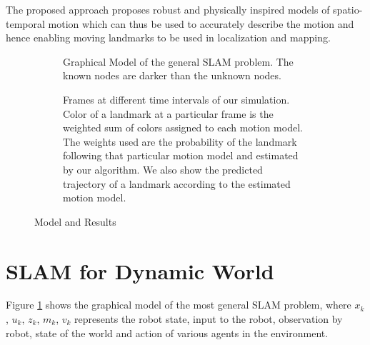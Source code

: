 \documentclass[10pt,twocolumn,letterpaper]{article}
\begin{document}
The proposed approach proposes robust and physically inspired models of spatio-temporal motion which can thus be used to accurately describe the motion and hence enabling moving landmarks to be used in localization and mapping.


\begin{figure*}[t]
  \begin{subfigure}[t]{0.33\textwidth}
    \scalebox{0.65}{  }
    \caption{Graphical Model of the general SLAM problem. The known nodes are darker than the unknown nodes.}
    \label{fig:graphical_model}
  \end{subfigure}
  \hskip1pt
  \vrule
  \hskip1pt
  \begin{subfigure}[t]{0.67\textwidth}
    \newlength{\imgwidth}
    \setlength{\imgwidth}{0.9\textwidth}
    \centering
    
    \caption{Frames at different time intervals of our simulation.
      Color of a landmark at a particular frame is the weighted sum of colors
      assigned to each motion model. The weights used are the probability of the
    landmark following that particular motion model and estimated by our algorithm. We also show the predicted trajectory of a landmark according to the estimated motion model.}
    \label{fig:results}
  \end{subfigure}
  \caption{Model and Results}
\end{figure*}

\section{SLAM for Dynamic World}
\begin{figure}

\end{figure}
Figure \ref{fig:graphical_model} shows the graphical model of the most general SLAM problem, where $x_k$, $u_k$, $z_k$, $m_k$, $v_k$ represents the robot state, input to the robot, observation by robot, state of the world and action of various agents in the environment.

\end{document}
